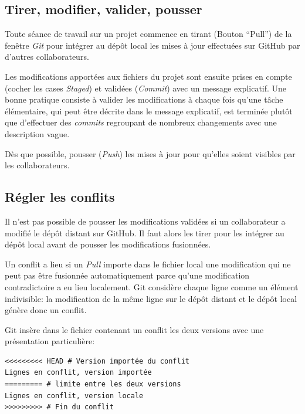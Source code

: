 \documentclass[
  12pt,
  french,
  a4paper,
  extrafontsizes,onecolumn,openright
  ]{memoir}
\begin{document}
\hypertarget{tirer-modifier-valider-pousser}{%
\subsection{Tirer, modifier, valider, pousser}\label{tirer-modifier-valider-pousser}}

Toute séance de travail sur un projet commence en tirant (Bouton \enquote{Pull}) de la fenêtre \emph{Git} pour intégrer au dépôt local les mises à jour effectuées sur GitHub par d'autres collaborateurs.

Les modifications apportées aux fichiers du projet sont ensuite prises en compte (cocher les cases \emph{Staged}) et validées (\emph{Commit}) avec un message explicatif.
Une bonne pratique consiste à valider les modifications à chaque fois qu'une tâche élémentaire, qui peut être décrite dans le message explicatif, est terminée plutôt que d'effectuer des \emph{commits} regroupant de nombreux changements avec une description vague.

Dès que possible, pousser (\emph{Push}) les mises à jour pour qu'elles soient visibles par les collaborateurs.

\hypertarget{ruxe9gler-les-conflits}{%
\subsection{Régler les conflits}\label{ruxe9gler-les-conflits}}

Il n'est pas possible de pousser les modifications validées si un collaborateur a modifié le dépôt distant sur GitHub.
Il faut alors les tirer pour les intégrer au dépôt local avant de pousser les modifications fusionnées.

Un conflit a lieu si un \emph{Pull} importe dans le fichier local une modification qui ne peut pas être fusionnée automatiquement parce qu'une modification contradictoire a eu lieu localement.
Git considère chaque ligne comme un élément indivisible: la modification de la même ligne sur le dépôt distant et le dépôt local génère donc un conflit.

Git insère dans le fichier contenant un conflit les deux versions avec une présentation particulière:

\begin{verbatim}
<<<<<<<<< HEAD # Version importée du conflit
Lignes en conflit, version importée
========= # limite entre les deux versions
Lignes en conflit, version locale
>>>>>>>>> # Fin du conflit
\end{verbatim}
\end{document}

